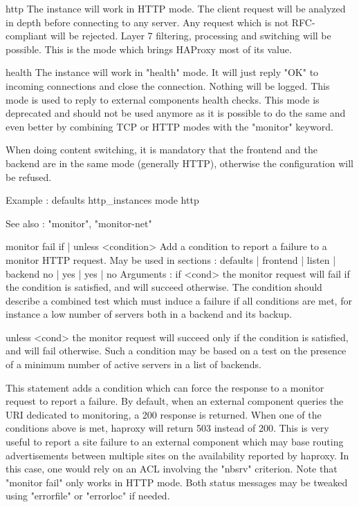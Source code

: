     http      The instance will work in HTTP mode. The client request will be
              analyzed in depth before connecting to any server. Any request
              which is not RFC-compliant will be rejected. Layer 7 filtering,
              processing and switching will be possible. This is the mode which
              brings HAProxy most of its value.

    health    The instance will work in "health" mode. It will just reply "OK"
              to incoming connections and close the connection. Nothing will be
              logged. This mode is used to reply to external components health
              checks. This mode is deprecated and should not be used anymore as
              it is possible to do the same and even better by combining TCP or
              HTTP modes with the "monitor" keyword.

  When doing content switching, it is mandatory that the frontend and the
  backend are in the same mode (generally HTTP), otherwise the configuration
  will be refused.

  Example :
     defaults http_instances
         mode http

  See also : "monitor", "monitor-net"


monitor fail { if | unless } <condition>
  Add a condition to report a failure to a monitor HTTP request.
  May be used in sections :   defaults | frontend | listen | backend
                                 no    |    yes   |   yes  |   no
  Arguments :
    if <cond>     the monitor request will fail if the condition is satisfied,
                  and will succeed otherwise. The condition should describe a
                  combined test which must induce a failure if all conditions
                  are met, for instance a low number of servers both in a
                  backend and its backup.

    unless <cond> the monitor request will succeed only if the condition is
                  satisfied, and will fail otherwise. Such a condition may be
                  based on a test on the presence of a minimum number of active
                  servers in a list of backends.

  This statement adds a condition which can force the response to a monitor
  request to report a failure. By default, when an external component queries
  the URI dedicated to monitoring, a 200 response is returned. When one of the
  conditions above is met, haproxy will return 503 instead of 200. This is
  very useful to report a site failure to an external component which may base
  routing advertisements between multiple sites on the availability reported by
  haproxy. In this case, one would rely on an ACL involving the "nbsrv"
  criterion. Note that "monitor fail" only works in HTTP mode. Both status
  messages may be tweaked using "errorfile" or "errorloc" if needed.


